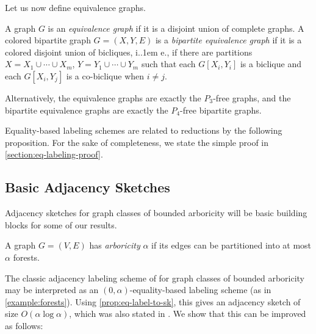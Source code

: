 \documentclass{article}
\makeatletter
\newcommand{\cF}{\ensuremath{\mathcal{F}}}
\newcommand{\Adj}{\textsc{Adj}}
\newcommand*\ie{i.\kern.1em e.\@\xspace} %
\newcommand\IfRestateTF{%
  \ifx\label\thmt@gobble@label %
    \expandafter\@firstoftwo
  \else
    \expandafter\@secondoftwo
  \fi
}
\newcommand{\RestateRemark}{\IfRestateTF{{\normalfont\bfseries (Restated) }}{}}
\makeatother
\begin{document}
Let us now define equivalence graphs.
\begin{definition}
	A graph $G$ is an \emph{equivalence graph} if it is a disjoint union of complete graphs.  A colored bipartite graph $G =
	(X,Y,E)$ is a \emph{bipartite equivalence graph} if it is a colored disjoint union of bicliques, \ie, 
	if there are partitions $X = X_1 \cup \dotsm \cup X_m$, $Y = Y_1 \cup \dotsm \cup Y_m$ such that each
	$G[X_i,Y_i]$ is a biclique and each $G[X_i,Y_j]$ is a co-biclique when $i \neq j$.

  Alternatively, the equivalence graphs are exactly the $P_3$-free graphs, and the bipartite
  equivalence graphs are exactly the $P_4$-free bipartite graphs. 
\end{definition}

Equality-based labeling schemes are related to reductions by the following proposition. For the sake
of completeness, we state the simple proof in \cref{section:eq-labeling-proof}.



\subsection{Basic Adjacency Sketches}
\label{sec:bounded-arboricity}

Adjacency sketches for graph classes of bounded arboricity will be basic building blocks for some
of our results.
\begin{definition}
A graph $G = (V,E)$ has \emph{arboricity} $\alpha$ if its edges can be partitioned into at most
$\alpha$ forests.
\end{definition}
The classic adjacency labeling scheme of \cite{KNR92} for graph classes of bounded arboricity may be
interpreted as an $(0,\alpha)$-equality-based labeling scheme (as in \cref{example:forests}).
Using \cref{prop:eq-label-to-sk}, this gives an adjacency sketch of size $O(\alpha \log \alpha)$,
which was also stated in \cite{Har20}. We show that this can be improved as follows:
\end{document}
